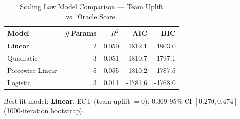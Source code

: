 \begin{table}[h]
  \centering
  \caption{Scaling Law Model Comparison — Team Uplift vs.\ Oracle Score.}
  \label{tab:scaling_law}
  \begin{tabular}{lrrrr}
    \toprule
    Model & \#Params & $R^2$ & AIC & BIC \\
    \midrule
    \textbf{Linear} & 2 & 0.050 & -1812.1 & -1803.0 \\
    Quadratic & 3 & 0.051 & -1810.7 & -1797.1 \\
    Piecewise Linear & 5 & 0.055 & -1810.2 & -1787.5 \\
    Logistic & 3 & 0.011 & -1781.6 & -1768.0 \\
    \bottomrule
  \end{tabular}
  \smallskip\par\noindent\small Best-fit model: \textbf{Linear}.
  ECT (team uplift $= 0$): $0.369$ 95\% CI $[0.270, 0.474]$ (1000-iteration bootstrap).
\end{table}
